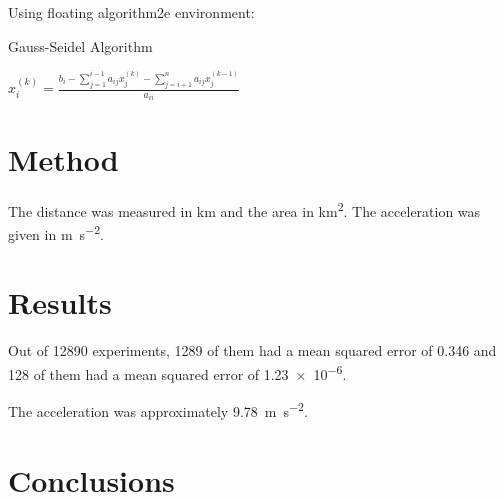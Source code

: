 \documentclass[oneside,12pt]{scrbook}
\theoremstyle{break}
\begin{document}
Using floating algorithm2e environment:

\begin{algorithm2e}
\caption{Gauss-Seidel Algorithm}\label{alg:gauss-seidel}
{
   {
     $
      x_i^{(k)} =
      \frac{b_i-\sum_{j=1}^{i-1}a_{ij}x_j^{(k)}
      -\sum_{j=i+1}^{n}a_{ij}x_j^{(k-1)}}%
      {a_{ii}}
      $\;
   }
}
\end{algorithm2e}


\chapter{Method}
\label{ch:method}

The distance was measured in \si{\kilo\metre} and the area in
\si{\kilo\metre\squared}. The acceleration was given in
\si{\metre\per\square\second}.

\chapter{Results}
\label{ch:results}

Out of \num{12890} experiments, \num{1289} of them had a mean
squared error of \num{.346} and \num{128} of them had a mean
squared error of \num{1.23e-6}.

The acceleration was approximately
\SI{9.78}{\metre\per\square\second}.


\chapter{Conclusions}
\label{ch:conc}


\backmatter


\end{document}
